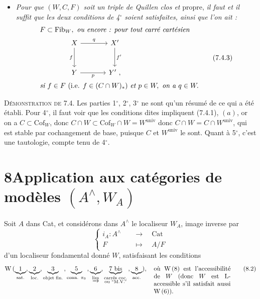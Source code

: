 \documentclass[11pt]{article}
\newcommand{\printedpage}[1]{\marginpar{\footnotesize p.~#1}}
\newcommand{\msp}[1]{\marginpar{\footnotesize [#1]}}
\newcommand{\Cof}{\mathrm{Cof}}
\newcommand{\Fib}{\mathrm{Fib}}
\newcommand{\Cat}{\mathrm{Cat}}
\newcommand{\univ}{\mathrm{univ}}
\newcommand{\chap}{^{\wedge}}
\begin{document}
\begin{itemize}[leftmargin=*]
\item[5$^\circ$)] \printedpage{55}
\textit{Pour que $(W,C,F)$ soit un triple de Quillen clos et} propre, \textit{il faut et il suffit que les deux conditions de 4$^\circ$ soient satisfaites, ainsi que l'on ait :}
\[
\begin{aligned}
&F\subset \Fib_W,\ \textit{ou encore : pour tout carré cartésien}\\
&\qquad\qquad\begin{tikzcd}[ampersand replacement=\&, row sep=large, column sep=large]
X \arrow[r, "q"] \arrow[d, "f"'] \& X' \arrow[d, "f'"] \\
Y \arrow[r, "p"'] \& Y'\ ,
\end{tikzcd}\\
&\textit{si } f\in F \ (\text{i.e. } f\in (C\cap W)_*)\ \textit{et } p\in W,\ \textit{on a } q\in W.
\end{aligned}
\tag*{(7.4.3)}
\]
\end{itemize}

\textsc{Démonstration de} 7.4. Les parties 1$^\circ$, 2$^\circ$, 3$^\circ$ ne sont qu'un résumé de ce qui a été établi. Pour 4$^\circ$, il faut voir que les conditions dites impliquent (7.4.1), $(a)$, or on a $C\subset \Cof_W$, donc $C\cap W\subset \Cof_W\cap W = W^{\univ}$
\msp{page 100}
donc $C\cap W = C\cap W^{\univ}$, qui est stable par cochangement de base, puisque $C$ et $W^{\univ}$ le sont. Quant à 5$^\circ$, c'est une tautologie, compte tenu de 4$^\circ$.

\section*{8\quad Application aux catégories de modèles $(A\chap,W_A)$}

Soit $A$ dans Cat, et considérons dans $A\chap$ le localiseur $W_A$, image inverse par
\[
\left\{
\begin{aligned}
i_A : A\chap \quad &\longrightarrow \quad \Cat\\
F \quad &\longmapsto \quad A/F
\end{aligned}
\right.
\tag*{(8.1)}
\]
d'un localiseur fondamental donné $W$, satisfaisant les conditions
\[
\mathrm{W}\,(\underbrace{1}_{\text{sat.}},\underbrace{2}_{\text{loc.}},\underbrace{3}_{\text{objet fin.}}\,,\underbrace{5}_{\text{conn. }\pi_0}\,,\underbrace{6}_{\varinjlim},\underbrace{7\text{ bis}}_{\substack{\text{carrés coc.}\\ \text{ou ``M.V.''}}}\,,\underbrace{8}_{\text{acc.}}),\quad
\text{\parbox[t]{4.3cm}{où W\,(8) est l'accessibilité de $W$ (donc $W$ est L-accessible s'il satisfait aussi W\,(6)).}}
\tag*{(8.2)}
\]
\end{document}
